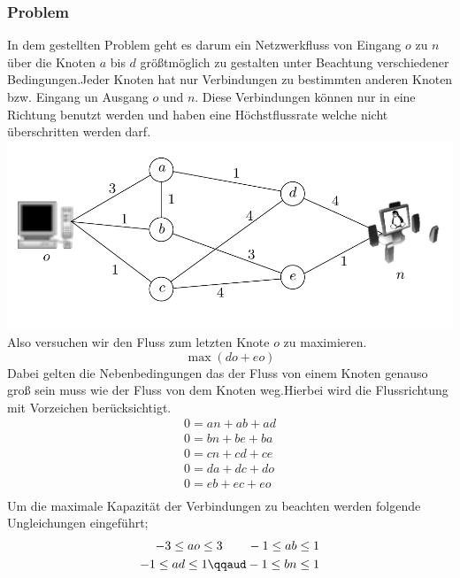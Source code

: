 \subsubsection{Problem}
	In dem gestellten Problem geht es darum ein Netzwerkfluss von Eingang $o$ zu $n$ über die Knoten $a$ bis $d$ größtmöglich zu gestalten unter Beachtung verschiedener Bedingungen.Jeder Knoten hat nur Verbindungen zu bestimmten anderen Knoten bzw. Eingang un Ausgang $o$ und $n$. Diese Verbindungen können nur in eine Richtung benutzt werden und haben eine Höchstflussrate welche nicht überschritten werden darf. 
	\includegraphics[width=\textwidth]{Netzwerkfluss_Bild.png}
	Also versuchen wir den Fluss zum letzten Knote $o$ zu maximieren.
	\[ \max(do+eo) \]
	Dabei gelten die Nebenbedingungen das der Fluss von einem Knoten genauso groß sein muss wie der Fluss von dem Knoten weg.Hierbei wird die Flussrichtung mit Vorzeichen berücksichtigt.
	\begin{align*}
		0=an+ab+ad\\
		0=bn+be+ba\\
		0=cn+cd+ce\\
		0=da+dc+do\\
		0=eb+ec+eo\\
	\end{align*}
	Um die maximale Kapazität der Verbindungen zu beachten werden folgende Ungleichungen eingeführt;
	\begin{align*}
		-3\leq{ao}\leq{3}\qquad
		-1\leq{ab}\leq{1}\\
		-1\leq{ad}\leq{1}\qqaud
		-1\leq{bn}\leq{1}\\
	\end{align*} 	
	